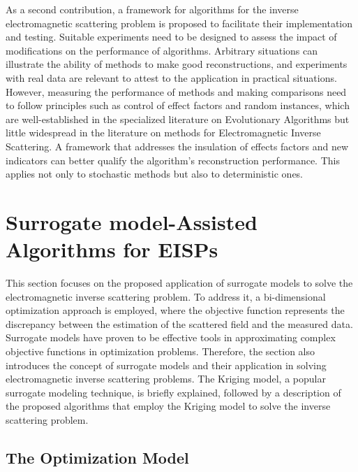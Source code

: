 		
		As a second contribution, a framework for algorithms for the inverse electromagnetic scattering problem is proposed to facilitate their implementation and testing. Suitable experiments need to be designed to assess the impact of modifications on the performance of algorithms. Arbitrary situations can illustrate the ability of methods to make good reconstructions, and experiments with real data are relevant to attest to the application in practical situations. However, measuring the performance of methods and making comparisons need to follow principles such as control of effect factors and random instances, which are well-established in the specialized literature on Evolutionary Algorithms but little widespread in the literature on methods for Electromagnetic Inverse Scattering. A framework that addresses the insulation of effects factors and new indicators can better qualify the algorithm’s reconstruction performance. This applies not only to stochastic methods but also to deterministic ones.
	
	\section{Surrogate model-Assisted Algorithms for EISPs}\label{chap:proposed-methodology:surrogate}

		This section focuses on the proposed application of surrogate models to solve the electromagnetic inverse scattering problem. To address it, a bi-dimensional optimization approach is employed, where the objective function represents the discrepancy between the estimation of the scattered field and the measured data. Surrogate models have proven to be effective tools in approximating complex objective functions in optimization problems. Therefore, the section also introduces the concept of surrogate models and their application in solving electromagnetic inverse scattering problems. The Kriging model, a popular surrogate modeling technique, is briefly explained, followed by a description of the proposed algorithms that employ the Kriging model to solve the inverse scattering problem.

		\subsection{The Optimization Model}\label{chap:proposed-methodology:surrogate:optimization}
		
